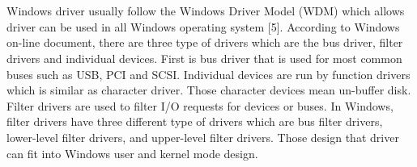 \documentclass[letterpaper,draftclsnofoot,journal,compsoc,10pt,onecolumn]{IEEEtran}
\begin{document}
\\\\
\indent Windows driver usually follow the Windows Driver Model (WDM) which allows driver can be used in all Windows operating system [5]. According to Windows on-line document, there are three type of drivers which are the bus driver, filter drivers and individual devices. First is bus driver that is used for most common buses such as USB, PCI and SCSI. Individual devices are run by function drivers which is similar as character driver. Those character devices mean un-buffer disk. Filter drivers are used to filter I/O requests for devices or buses. In Windows, filter drivers have three different type of drivers which are bus filter drivers, lower-level filter drivers, and upper-level filter drivers. Those design that driver can fit into Windows user and kernel mode design.
\end{document}
